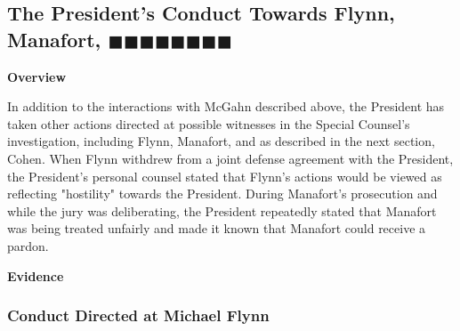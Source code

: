 \subsection{The President's Conduct Towards Flynn, Manafort, $\blacksquare\blacksquare\blacksquare\blacksquare\blacksquare\blacksquare\blacksquare\blacksquare$}

\begin{center}
\textbf{Overview}
\end{center}

In addition to the interactions with McGahn described above, the President has taken other actions directed at possible witnesses in the Special Counsel's investigation, including Flynn, Manafort,  and as described in the next section, Cohen.
When Flynn withdrew from a joint defense agreement with the President, the President's personal counsel stated that Flynn's actions would be viewed as reflecting "hostility" towards the President.
During Manafort's prosecution and while the jury was deliberating, the President repeatedly stated that Manafort was being treated unfairly and made it known that Manafort could receive a pardon.

\begin{center}
\textbf{Evidence}
\end{center}

\subsubsection{Conduct Directed at Michael Flynn}

